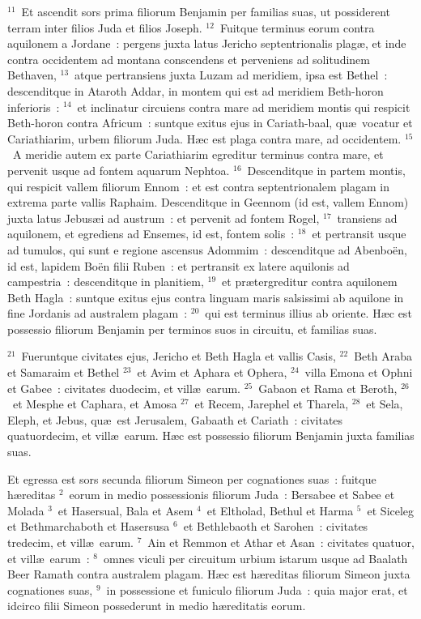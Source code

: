 ${}^{11}$~Et ascendit sors prima filiorum Benjamin per familias suas, ut possiderent terram inter filios Juda et filios Joseph.
${}^{12}$~Fuitque terminus eorum contra aquilonem a Jordane~: pergens juxta latus Jericho septentrionalis plag\ae , et inde contra occidentem ad montana conscendens et perveniens ad solitudinem Bethaven,
${}^{13}$~atque pertransiens juxta Luzam ad meridiem, ipsa est Bethel~: descenditque in Ataroth Addar, in montem qui est ad meridiem Beth-horon inferioris~:
${}^{14}$~et inclinatur circuiens contra mare ad meridiem montis qui respicit Beth-horon contra Africum~: suntque exitus ejus in Cariath-baal, qu\ae\ vocatur et Cariathiarim, urbem filiorum Juda. H\ae c est plaga contra mare, ad occidentem.
${}^{15}$~A meridie autem ex parte Cariathiarim egreditur terminus contra mare, et pervenit usque ad fontem aquarum Nephtoa.
${}^{16}$~Descenditque in partem montis, qui respicit vallem filiorum Ennom~: et est contra septentrionalem plagam in extrema parte vallis Raphaim. Descenditque in Geennom (id est, vallem Ennom) juxta latus Jebus\ae i ad austrum~: et pervenit ad fontem Rogel,
${}^{17}$~transiens ad aquilonem, et egrediens ad Ensemes, id est, fontem solis~:
${}^{18}$~et pertransit usque ad tumulos, qui sunt e regione ascensus Adommim~: descenditque ad Abenbo\"en, id est, lapidem Bo\"en filii Ruben~: et pertransit ex latere aquilonis ad campestria~: descenditque in planitiem,
${}^{19}$~et pr\ae tergreditur contra aquilonem Beth Hagla~: suntque exitus ejus contra linguam maris salsissimi ab aquilone in fine Jordanis ad australem plagam~:
${}^{20}$~qui est terminus illius ab oriente. H\ae c est possessio filiorum Benjamin per terminos suos in circuitu, et familias suas.


${}^{21}$~Fueruntque civitates ejus, Jericho et Beth Hagla et vallis Casis,
${}^{22}$~Beth Araba et Samaraim et Bethel
${}^{23}$~et Avim et Aphara et Ophera,
${}^{24}$~villa Emona et Ophni et Gabee~: civitates duodecim, et vill\ae\ earum.
${}^{25}$~Gabaon et Rama et Beroth,
${}^{26}$~et Mesphe et Caphara, et Amosa
${}^{27}$~et Recem, Jarephel et Tharela,
${}^{28}$~et Sela, Eleph, et Jebus, qu\ae\ est Jerusalem, Gabaath et Cariath~: civitates quatuordecim, et vill\ae\ earum. H\ae c est possessio filiorum Benjamin juxta familias suas.

\lettrine[lines=3,image=true,loversize=0.05,lraise=-0.03]{E}{}t egressa est sors secunda filiorum Simeon per cognationes suas~: fuitque h\ae reditas
${}^{2}$~eorum in medio possessionis filiorum Juda~: Bersabee et Sabee et Molada
${}^{3}$~et Hasersual, Bala et Asem
${}^{4}$~et Eltholad, Bethul et Harma
${}^{5}$~et Siceleg et Bethmarchaboth et Hasersusa
${}^{6}$~et Bethlebaoth et Sarohen~: civitates tredecim, et vill\ae\ earum.
${}^{7}$~Ain et Remmon et Athar et Asan~: civitates quatuor, et vill\ae\ earum~:
${}^{8}$~omnes viculi per circuitum urbium istarum usque ad Baalath Beer Ramath contra australem plagam. H\ae c est h\ae reditas filiorum Simeon juxta cognationes suas,
${}^{9}$~in possessione et funiculo filiorum Juda~: quia major erat, et idcirco filii Simeon possederunt in medio h\ae reditatis eorum.


